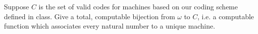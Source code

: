 \begin{problem}
  Suppose $C$ is the set of valid codes for machines based on
  our coding scheme defined in class. Give a total, computable
  bijection from $\omega$ to $C$,
  i.e. a computable function which associates every natural number
  to a unique machine. 

  \begin{answer}
    
  \end{answer}
\end{problem}
